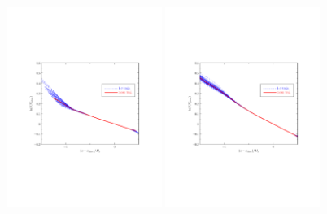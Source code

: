 \documentclass[11pt]{article}
\def \halffigwidth{0.45\textwidth}
\begin{document}
\begin{figure}
  \includegraphics[width=\halffigwidth,  trim = 1in 3in 1in 3in]{nobicep_spline0_p11_r0d2_potential_traj.pdf}%
  \includegraphics[width=\halffigwidth,  trim = 1in 3in 1in 3in]{nobicep_spline0_p11_r0d5_potential_traj.pdf}

\end{figure}
\end{document}
